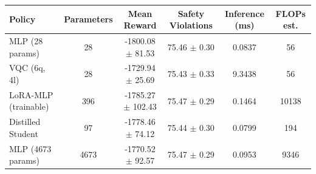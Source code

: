 \footnotesize
\setlength{\tabcolsep}{4pt}
\begin{tabular}{lccccc}
\toprule
Policy & Parameters & Mean Reward & Safety Violations & Inference (ms) & FLOPs est. \\
\midrule
MLP (28 params) & 28 & -1800.08 $\pm$ 81.53 & 75.46 $\pm$ 0.30 & 0.0837 & 56 \\
VQC (6q, 4l) & 28 & -1729.94 $\pm$ 25.69 & 75.43 $\pm$ 0.33 & 9.3438 & 56 \\
LoRA-MLP (trainable) & 396 & -1785.27 $\pm$ 102.43 & 75.47 $\pm$ 0.29 & 0.1464 & 10138 \\
Distilled Student & 97 & -1778.46 $\pm$ 74.12 & 75.44 $\pm$ 0.30 & 0.0799 & 194 \\
MLP (4673 params) & 4673 & -1770.52 $\pm$ 92.57 & 75.47 $\pm$ 0.29 & 0.0953 & 9346 \\
\bottomrule
\end{tabular}
